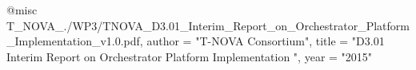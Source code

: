 @misc{ T_NOVA_./WP3/TNOVA_D3.01_Interim_Report_on_Orchestrator_Platform_Implementation_v1.0.pdf,
       author = "{T-NOVA Consortium}",
       title = "D3.01 Interim Report on Orchestrator Platform Implementation ",
       year = "2015" }
